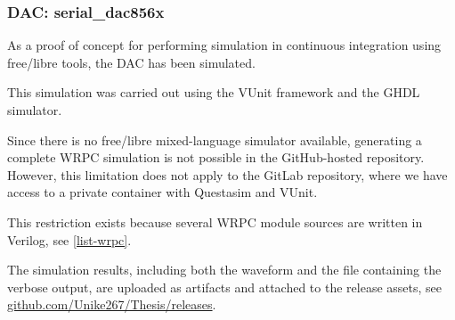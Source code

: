 \subsubsection{DAC: serial\_dac856x}

\noindent As a proof of concept for performing simulation in continuous integration using free/libre tools, the  DAC has been simulated.

\vspace{5mm}

\noindent This simulation was carried out using the VUnit \cite{gh:vunit} framework and the GHDL \cite{gh:ghdl} simulator.

\vspace{5mm}

\noindent Since there is no free/libre mixed-language simulator available, generating a complete WRPC simulation is not possible in the GitHub-hosted repository. However, this limitation does not apply to the GitLab repository, where we have access to a private container with Questasim and VUnit.

\vspace{5mm}

\noindent This restriction exists because several WRPC module sources are written in Verilog, see \ref{list-wrpc}.

\vspace{5mm}

\noindent The simulation results, including both the waveform and the  file containing the verbose output, are uploaded as artifacts and attached to the release assets, see \href{https://github.com/Unike267/Thesis/releases}{github.com/Unike267/Thesis/releases}.
